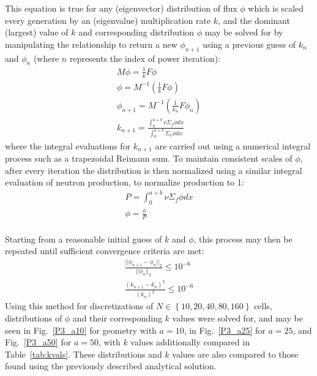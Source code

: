 \documentclass[12pt]{article}
\newcommand{\figref}[1]{Fig.~\ref{#1}}
\begin{document}
This equation is true for any (eigenvector) distribution of flux $\phi$ which is scaled every generation by an (eigenvalue) multiplication rate $k$, and the dominant (largest) value of $k$ and corresponding distribution $\phi$ may be solved for by manipulating the relationship to return a new $\phi_{n+1}$ using a previous guess of $k_n$ and $\phi_n$ (where $n$ represents the index of power iteration):
\begin{equation}
    \label{eq:pow-iter}
    \begin{gathered}
        M\phi = \frac{1}{k}F\phi \\
        \phi = M^{-1}\left(\frac{1}{k}F\phi\right)\\
        \phi_{n+1} = M^{-1}\left(\frac{1}{k_n}F\phi_n\right)\\
        k_{n+1} = \frac{\int_{0}^{a+b}\nu\Sigma_{f}\phi dx}{\int_{0}^{a+b}\Sigma_{a}\phi dx}
    \end{gathered}
\end{equation}
where the integral evaluations for $k_{n+1}$ are carried out using a numerical integral process such as a trapezoidal Reimann sum.
To maintain consistent scales of $\phi$, after every iteration the distribution is then normalized using a similar integral evaluation of neutron production, to normalize production to 1:
\begin{gather}
    P=\int_{0}^{a+b}\nu\Sigma_{f}\phi dx\\
    \phi = \frac{\phi}{P}
\end{gather}
\\

Starting from a reasonable initial guess of $k$ and $\phi$, this process may then be repeated until sufficient convergence criteria are met:
\begin{equation}
    \label{eq:convergence}
    \begin{gathered}
        \frac{||\phi_{n+1}-\phi_{n}||_2}{||\phi_n||_2} \leq 10^{-6}\\
        \frac{(k_{n+1}-k_n)^2}{(k_n)^2}\leq 10^{-6}
    \end{gathered}
\end{equation}
Using this method for discretizations of $N\in\left\{10, 20, 40, 80, 160\right\}$ cells, distributions of $\phi$ and their corresponding $k$ values were solved for, and may be seen in \figref{P3_a10} for geometry with $a=10$, in \figref{P3_a25} for $a=25$, and \figref{P3_a50} for $a=50$, with $k$ values additionally compared in Table~\ref{tab:kvals}. 
These distributions and $k$ values are also compared to those found using the previously described analytical solution.
\FloatBarrier
\end{document}

